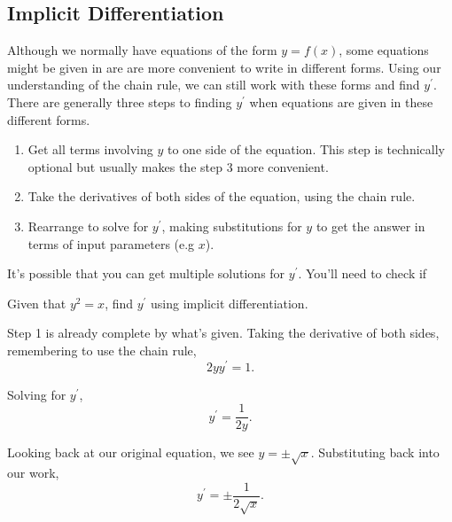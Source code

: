 \subsection{Implicit Differentiation}
Although we normally have equations of the form $y = f(x)$, some equations might be given in are are more convenient to write in different forms.
Using our understanding of the chain rule, we can still work with these forms and find $y^\prime$. There are generally three steps to finding $y^\prime$ when equations are given in these different forms.
\begin{enumerate}
	\item Get all terms involving $y$ to one side of the equation. This step is technically optional but usually makes the step 3 more convenient.
	\item Take the derivatives of both sides of the equation, using the chain rule.
	\item Rearrange to solve for $y^\prime$, making substitutions for $y$ to get the answer in terms of input parameters (e.g $x$).
\end{enumerate}
It's possible that you can get multiple solutions for $y^\prime$.
You'll need to check if 

\begin{example}
	Given that $y^2 = x$, find $y^\prime$ using implicit differentiation.
\end{example}
\begin{answer}
	Step 1 is already complete by what's given.
	Taking the derivative of both sides, remembering to use the chain rule,
	\begin{equation*}
		2yy^\prime = 1.
	\end{equation*}
	
	Solving for $y^\prime$,
	\begin{equation*}
		y^\prime = \frac{1}{2y}.
	\end{equation*}
	
	Looking back at our original equation, we see $y = \pm\sqrt{x}$.
	Substituting back into our work,
	\begin{equation*}
		y^\prime = \pm\frac{1}{2\sqrt{x}}.
	\end{equation*}
\end{answer}

